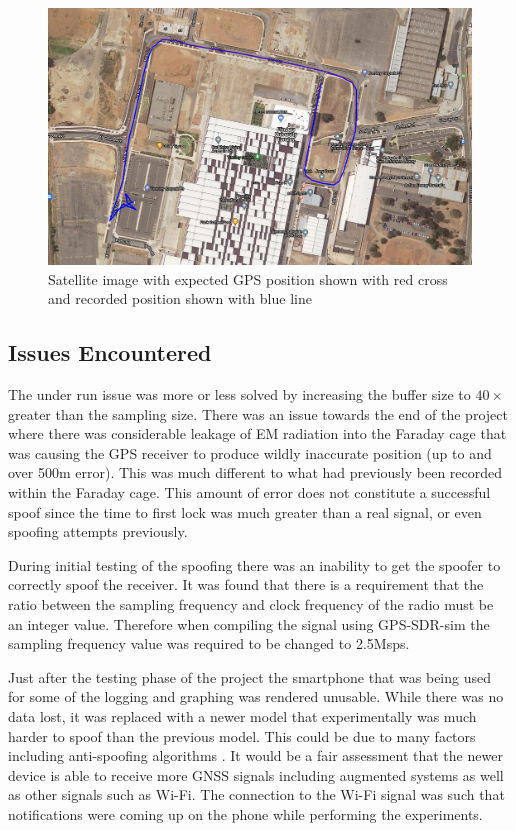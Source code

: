 \begin{figure}[h]
    \begin{centering}
        \includegraphics[width=14cm,keepaspectratio]{Figures/2021_3_30_dynamic_MAB_Satellite.PNG}
        \caption{Satellite image with expected GPS position shown with red cross and recorded position shown with blue line}
        \label{fig:MABdynamicSatelliteImage}
    \end{centering}
\end{figure}

\subsection{Issues Encountered}
The under run issue was more or less solved by increasing the buffer size to $40\times$ greater than the sampling size.
There was an issue towards the end of the project where there was considerable leakage of EM radiation into the Faraday cage that was causing the GPS receiver to produce
wildly inaccurate position (up to and over 500m error). This was much different to what had previously been recorded within the Faraday cage. This amount of error does
not constitute a successful spoof since the time to first lock was much greater than a real signal, or even spoofing attempts previously. 

During initial testing of the spoofing there was an inability to get the spoofer to correctly spoof the receiver. It was found that there is a requirement that the ratio
between the sampling frequency and clock frequency of the radio must be an integer value. Therefore when compiling the signal using GPS-SDR-sim the sampling frequency
value was required to be changed to 2.5Msps.  

Just after the testing phase of the project the smartphone that was being used for some of the logging and graphing was rendered unusable. While there was no data lost,
it was replaced with a newer model that experimentally was much harder to spoof than the previous model. This could be due to many factors including anti-spoofing
algorithms \cite{RN39}. It would be a fair assessment that the newer device is able to receive more GNSS signals including augmented systems as well as other signals such as Wi-Fi.
The connection to the Wi-Fi signal was such that notifications were coming up on the phone while performing the experiments.

